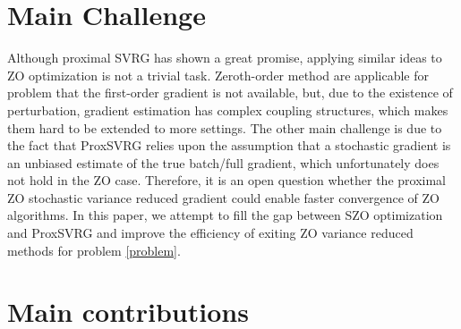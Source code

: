 \documentclass{article}
\theoremstyle{definition}
\theoremstyle{remark}
\begin{document}
\section{Main Challenge}
{\color{Brown}
Although proximal SVRG has shown a great promise, applying similar ideas to ZO optimization is not a trivial
task. 
{\color{DarkOrchid}
Zeroth-order method are applicable for problem that the first-order gradient is not available, but, due to the existence of
perturbation, gradient estimation has complex coupling structures, which makes
them hard to be extended to more settings. 
}
The other main challenge is due to the fact that ProxSVRG relies upon the assumption that a stochastic gradient is an unbiased estimate of the true batch/full gradient, which unfortunately does not hold in the ZO case. Therefore, it is an open question whether the proximal ZO stochastic variance reduced gradient could enable faster convergence of ZO algorithms. In this paper, we attempt to fill the gap between
SZO optimization and ProxSVRG and improve the efficiency of exiting ZO variance reduced methods for problem \eqref{problem}.
}


\section{Main contributions}
\end{document}
